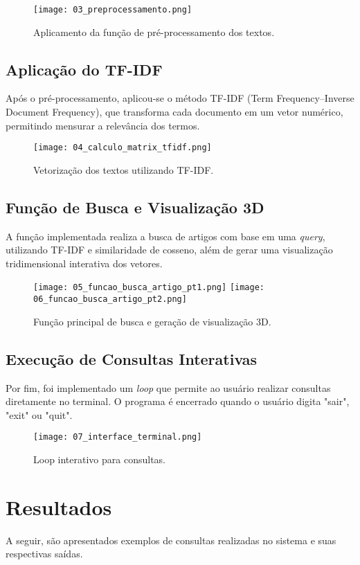 \documentclass[12pt,a4paper]{article}
\begin{document}
\begin{figure}[H]
    \centering
    \texttt{[image: 03\_preprocessamento.png]}
    \caption{Aplicamento da função de pré-processamento dos textos.}
\end{figure}

\subsection{Aplicação do TF-IDF}
Após o pré-processamento, aplicou-se o método TF-IDF (Term Frequency–Inverse Document Frequency), que transforma cada documento em um vetor numérico, permitindo mensurar a relevância dos termos.

\begin{figure}[H]
    \centering
    \texttt{[image: 04\_calculo\_matrix\_tfidf.png]}
    \caption{Vetorização dos textos utilizando TF-IDF.}
\end{figure}

\subsection{Função de Busca e Visualização 3D}
A função implementada realiza a busca de artigos com base em uma \textit{query}, utilizando TF-IDF e similaridade de cosseno, além de gerar uma visualização tridimensional interativa dos vetores.

\begin{figure}[H]
    \centering
    \texttt{[image: 05\_funcao\_busca\_artigo\_pt1.png]}
    \texttt{[image: 06\_funcao\_busca\_artigo\_pt2.png]}
    \caption{Função principal de busca e geração de visualização 3D.}
\end{figure}

\subsection{Execução de Consultas Interativas}
Por fim, foi implementado um \textit{loop} que permite ao usuário realizar consultas diretamente no terminal. O programa é encerrado quando o usuário digita "sair", "exit" ou "quit".

\begin{figure}[H]
    \centering
    \texttt{[image: 07\_interface\_terminal.png]}
    \caption{Loop interativo para consultas.}
\end{figure}

\section{Resultados}
A seguir, são apresentados exemplos de consultas realizadas no sistema e suas respectivas saídas.
\end{document}

